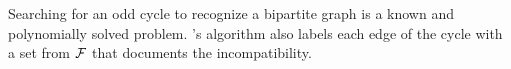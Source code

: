 Searching for an odd cycle to recognize a bipartite graph is a known
and polynomially solved problem. \cite{mcc04}'s algorithm also labels
each edge of the cycle with a set from ${\cal F}$ that documents the
incompatibility.


















